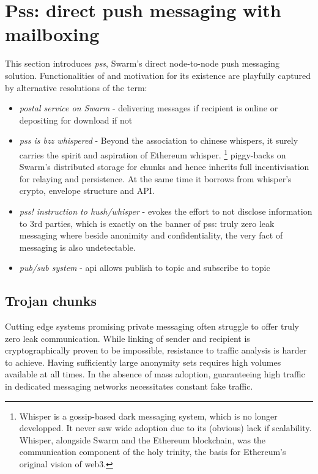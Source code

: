 \section{Pss: direct push messaging with mailboxing}\label{sec:pss}

\green{}

This section introduces \emph{pss}, Swarm's direct node-to-node push messaging solution. 
Functionalities of and motivation for its existence are playfully captured by alternative resolutions of the term:

\begin{itemize}
\item \emph{postal service on Swarm} - delivering messages if recipient is online or depositing for download if not
\item \emph{pss is bzz whispered} - Beyond the association to chinese whispers, it surely carries the spirit and aspiration of Ethereum whisper.%
%
\footnote{Whisper is a gossip-based dark messaging system, which is no longer developped. It never saw wide adoption due to its (obvious) lack if  scalability. Whisper, alongside Swarm and the Ethereum blockchain, was the communication component of the holy trinity, the basis for Ethereum's original vision of web3.}
%
piggy-backs on Swarm's distributed storage for chunks and hence inherits full incentivisation for relaying and persistence. At the same time it borrows from whisper's crypto, envelope structure and API.
\item \emph{pss! instruction to hush/whisper} - evokes the effort to not disclose information to 3rd parties, which is exactly on the banner of pss: truly zero  leak messaging where beside anonimity and confidentiality, the very fact of messaging is also undetectable.
\item  \emph{pub/sub system} - api allows publish to topic and subscribe to topic
\end{itemize}


\subsection{Trojan chunks}\label{sec:trojan}

Cutting edge systems promising private messaging often struggle to offer truly zero leak communication. While linking of sender and recipient is cryptographically proven to be impossible, resistance to traffic analysis is harder to achieve. Having sufficiently large anonymity sets requires high volumes available at all times. In the absence of mass adoption, guaranteeing high traffic in dedicated messaging networks necessitates constant fake traffic. 


